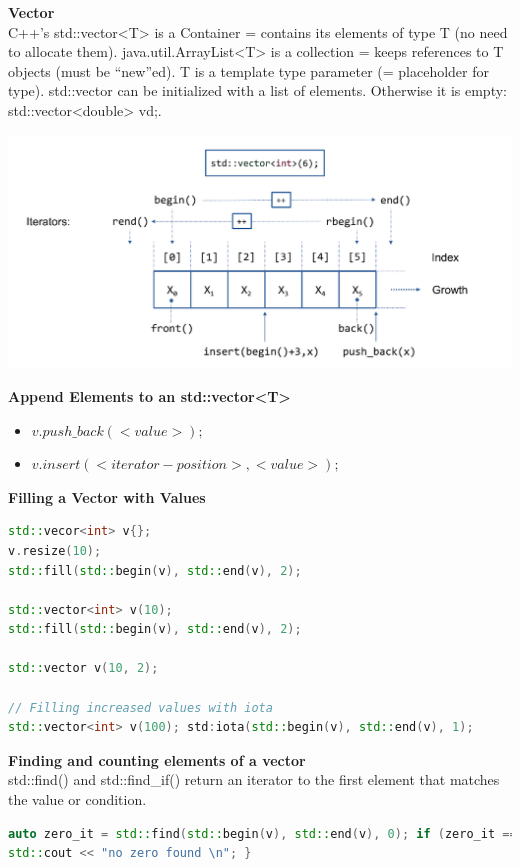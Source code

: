 \textbf{Vector}\\
C++'s std::vector<T> is a Container = contains its elements of type T (no need to allocate them). java.util.ArrayList<T> is a collection = keeps references to T objects (must be “new”ed).  T is a template type parameter (= placeholder for type). std::vector can be initialized with a list of elements. Otherwise it is empty: std::vector<double> vd{};.
\begin{center}
\includegraphics[width=0.75\linewidth]{images/vector}
\end{center}
\textbf{Append Elements to an std::vector<T>}
\begin{itemize}
  \itemsep -0.5em 
  \item $v.push\_back(<value>);$
  \item $v.insert (<iterator-position>, <value>);$
\end{itemize}

\textbf{Filling a Vector with Values}
\begin{lstlisting}[language=C++]
std::vecor<int> v{};
v.resize(10);
std::fill(std::begin(v), std::end(v), 2);

std::vector<int> v(10); 
std::fill(std::begin(v), std::end(v), 2);

std::vector v(10, 2);

// Filling increased values with iota
std::vector<int> v(100); std:iota(std::begin(v), std::end(v), 1);
\end{lstlisting}

\textbf{Finding and counting elements of a vector} \\
 std::find() and std::find\_if() return an iterator to the first element that matches the value or condition.
\begin{lstlisting}[language=C++]
auto zero_it = std::find(std::begin(v), std::end(v), 0); if (zero_it == std::end(v)) {
std::cout << "no zero found \n"; }
	
\end{lstlisting}




